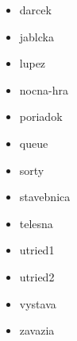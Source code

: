 



\begin{itemize}
\item darcek
\item jablcka
\item lupez
\item nocna-hra
\item poriadok
\item queue
\item sorty
\item stavebnica
\item telesna
\item utried1
\item utried2
\item vystava
\item zavazia
\end{itemize}

